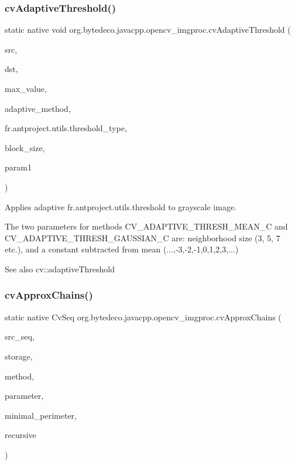 \subsubsection{\texorpdfstring{cv\+Adaptive\+Threshold()}{cvAdaptiveThreshold()}}
{\footnotesize\ttfamily static native void org.\+bytedeco.\+javacpp.\+opencv\+\_\+imgproc.\+cv\+Adaptive\+Threshold (\begin{DoxyParamCaption}\item[{@Const Cv\+Arr}]{src,  }\item[{Cv\+Arr}]{dst,  }\item[{double}]{max\+\_\+value,  }\item[{int}]{adaptive\+\_\+method,  }\item[{int}]{fr.antproject.utils.threshold\+\_\+type,  }\item[{int}]{block\+\_\+size,  }\item[{double}]{param1 }\end{DoxyParamCaption})\hspace{0.3cm}{\ttfamily [static]}}



Applies adaptive fr.antproject.utils.threshold to grayscale image.

The two parameters for methods C\+V\+\_\+\+A\+D\+A\+P\+T\+I\+V\+E\+\_\+\+T\+H\+R\+E\+S\+H\+\_\+\+M\+E\+A\+N\+\_\+C and C\+V\+\_\+\+A\+D\+A\+P\+T\+I\+V\+E\+\_\+\+T\+H\+R\+E\+S\+H\+\_\+\+G\+A\+U\+S\+S\+I\+A\+N\+\_\+C are\+: neighborhood size (3, 5, 7 etc.), and a constant subtracted from mean (...,-\/3,-\/2,-\/1,0,1,2,3,...) \begin{DoxySeeAlso}{See also}
cv\+::adaptive\+Threshold 
\end{DoxySeeAlso}
\mbox{\label{group__imgproc__c_ga5c874856009b84fc0c3a9533f957516c}} 
\subsubsection{\texorpdfstring{cv\+Approx\+Chains()}{cvApproxChains()}}
{\footnotesize\ttfamily static native Cv\+Seq org.\+bytedeco.\+javacpp.\+opencv\+\_\+imgproc.\+cv\+Approx\+Chains (\begin{DoxyParamCaption}\item[{Cv\+Seq}]{src\+\_\+seq,  }\item[{Cv\+Mem\+Storage}]{storage,  }\item[{int}]{method,  }\item[{double}]{parameter,  }\item[{int}]{minimal\+\_\+perimeter,  }\item[{int}]{recursive }\end{DoxyParamCaption})\hspace{0.3cm}{\ttfamily [static]}}



